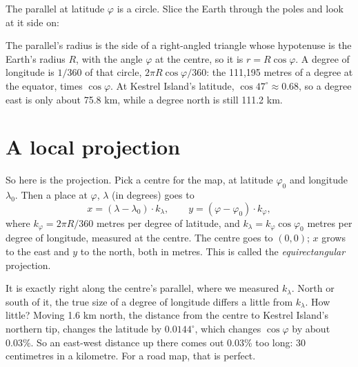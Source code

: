 The parallel at latitude $\varphi$ is a circle. Slice the Earth through
the poles and look at it side on:

\begin{center}
\end{center}

The parallel's radius is the side of a right-angled triangle whose
hypotenuse is the Earth's radius $R$, with the angle $\varphi$ at the
centre, so it is $r = R\cos\varphi$. A degree of longitude is $1/360$ of
that circle, $2\pi R \cos\varphi / 360$: the 111,195 metres of a degree at
the equator, times $\cos\varphi$. At Kestrel Island's latitude,
$\cos 47^\circ \approx 0.68$, so a degree east is only about 75.8 km, while
a degree north is still 111.2 km.

\section{A local projection}

So here is the projection. Pick a centre for the map, at latitude
$\varphi_0$ and longitude $\lambda_0$. Then a place at $\varphi$, $\lambda$
(in degrees) goes to
\[
  x = (\lambda - \lambda_0) \cdot k_\lambda, \qquad
  y = (\varphi - \varphi_0) \cdot k_\varphi,
\]
where $k_\varphi = 2\pi R/360$ metres per degree of latitude, and
$k_\lambda = k_\varphi \cos\varphi_0$ metres per degree of longitude,
measured at the centre. The centre goes to $(0, 0)$; $x$ grows to the east
and $y$ to the north, both in metres. This is called the
\emph{equirectangular} projection.

It is exactly right along the centre's parallel, where we measured
$k_\lambda$. North or south of it, the true size of a degree of longitude
differs a little from $k_\lambda$. How little? Moving 1.6 km north, the
distance from the centre to Kestrel Island's northern tip, changes the
latitude by $0.0144^\circ$, which changes $\cos\varphi$ by about 0.03\%.
So an east-west distance up there comes out 0.03\% too long: 30
centimetres in a kilometre. For a road map, that is perfect.

